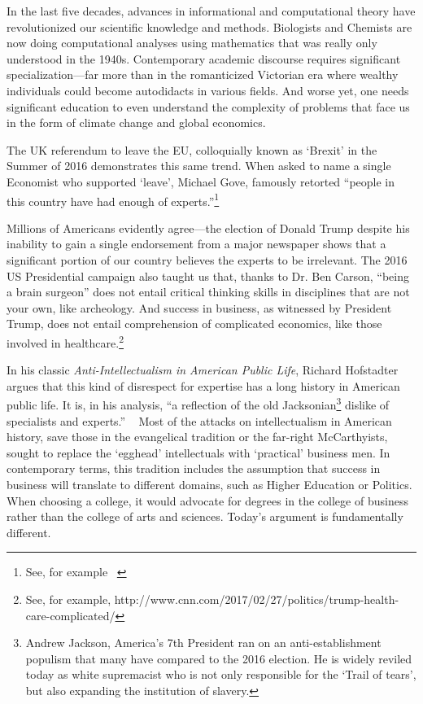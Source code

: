 In the last five decades, advances in informational and computational theory have revolutionized our scientific knowledge and methods. Biologists and Chemists are now doing computational analyses using mathematics that was really only understood in the 1940s. Contemporary academic discourse requires significant specialization---far more than in the romanticized Victorian era where wealthy individuals could become autodidacts in various fields. And worse yet, one needs significant education to even understand the complexity of problems that face us in the form of climate change and global economics.

The UK referendum to leave the EU, colloquially known as `Brexit' in the Summer of 2016 demonstrates this same trend. When asked to name a single Economist who supported `leave', Michael Gove, famously retorted ``people in this country have had enough of experts.''\footnote{See, for example ~\citep{Anonymous:30_2-QSd}}

Millions of Americans evidently agree---the election of Donald Trump despite his inability to gain a single endorsement from a major newspaper shows that a significant portion of our country believes the experts to be irrelevant. The 2016 US Presidential campaign also taught us that, thanks to Dr. Ben Carson, ``being a brain surgeon'' does not entail critical thinking skills in disciplines that are not your own, like archeology. And success in business, as witnessed by President Trump, does not entail comprehension of complicated economics, like those involved in healthcare.\footnote{See, for example, http:\slash \slash www.cnn.com\slash 2017\slash 02\slash 27\slash politics\slash trump-health-care-complicated\slash }

In his classic \emph{Anti-Intellectualism in American Public Life}, Richard Hofstadter argues that this kind of disrespect for expertise has a long history in American public life. It is, in his analysis, ``a reflection of the old Jacksonian\footnote{Andrew Jackson, America's 7th President ran on an anti-establishment populism that many have compared to the 2016 election. He is widely reviled today as white supremacist who is not only responsible for the `Trail of tears', but also expanding the institution of slavery.} dislike of specialists and experts.'' ~\citep[p. 14]{Hofstadter:1966td} Most of the attacks on intellectualism in American history, save those in the evangelical tradition or the far-right McCarthyists, sought to replace the `egghead' intellectuals with `practical' business men. In contemporary terms, this tradition includes the assumption that success in business will translate to different domains, such as Higher Education or Politics. When choosing a college, it would advocate for degrees in the college of business rather than the college of arts and sciences. Today's argument is fundamentally different.


